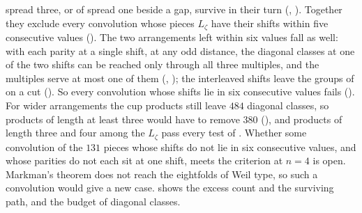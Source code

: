 \begin{remark}
spread three, or of spread one beside a gap, survive in their turn
(, ). Together they exclude
every convolution whose pieces $L_{\zeta}$ have their shifts within five
consecutive values (). The two arrangements left within
six values fall as well: with each parity at a single shift, at any odd
distance, the diagonal classes at one of the two shifts can be reached only
through all three multiples, and the multiples serve at most one of them
(, ); the interleaved shifts
leave the groups of  on a cut
(). So every convolution whose shifts lie in six
consecutive values fails (). For wider arrangements the
cup products still leave $484$ diagonal classes, so products of length at
least three would have to remove $380$ (), and
products of length three and four among the $L_{\zeta}$ pass every test of
. Whether some convolution of the $131$ pieces whose
shifts do not lie in six consecutive values, and whose parities do not each
sit at one shift, meets the criterion at $n=4$ is open. Markman's theorem
does not reach the eightfolds of Weil type, so such a convolution would give
a new case.
 shows the excess count and the
surviving path, and  the budget of diagonal
classes.
\end{remark}
